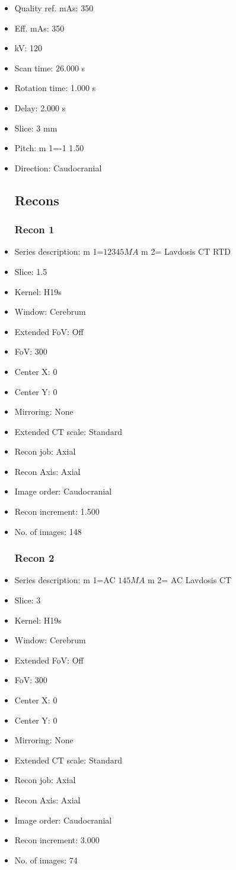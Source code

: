 \documentclass[12pt]{article}
\begin{document}
\begin{itemize}
\subsection{Scan}
\item Quality ref. mAs: 350\item Eff. mAs: 350\item kV: 120\item Scan time: 26.000 s\item Rotation time: 1.000 s\item Delay: 2.000 s\item Slice: 3 mm\item Pitch: m 1=-1 1.50\item Direction: Caudocranial\subsection{Recons}

\subsubsection{Recon 1}
\item Series description: m 1=$1$$2$$3$$4$$5$$M$$A$ m 2= Lavdosis CT RTD
\item Slice: 1.5
\item Kernel: H19s
\item Window: Cerebrum
\item Extended FoV: Off
\item FoV: 300
\item Center X: 0
\item Center Y: 0
\item Mirroring: None
\item Extended CT scale: Standard
\item Recon job: Axial
\item Recon Axis: Axial
\item Image order: Caudocranial
\item Recon increment: 1.500
\item No. of images: 148
\subsubsection{Recon 2}
\item Series description: m 1=AC $1$$4$$5$$M$$A$ m 2= AC Lavdosis CT
\item Slice: 3
\item Kernel: H19s
\item Window: Cerebrum
\item Extended FoV: Off
\item FoV: 300
\item Center X: 0
\item Center Y: 0
\item Mirroring: None
\item Extended CT scale: Standard
\item Recon job: Axial
\item Recon Axis: Axial
\item Image order: Caudocranial
\item Recon increment: 3.000
\item No. of images: 74

\end{itemize}
\end{document}
